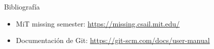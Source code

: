 \begin{frame}{Bibliografía}
\begin{itemize}
    \item MiT missing semester: \href{https://missing.csail.mit.edu/}{https://missing.csail.mit.edu/} 
    \item Documentación de Git: \href{https://git-scm.com/docs/user-manual}{https://git-scm.com/docs/user-manual}
\end{itemize}
\end{frame}